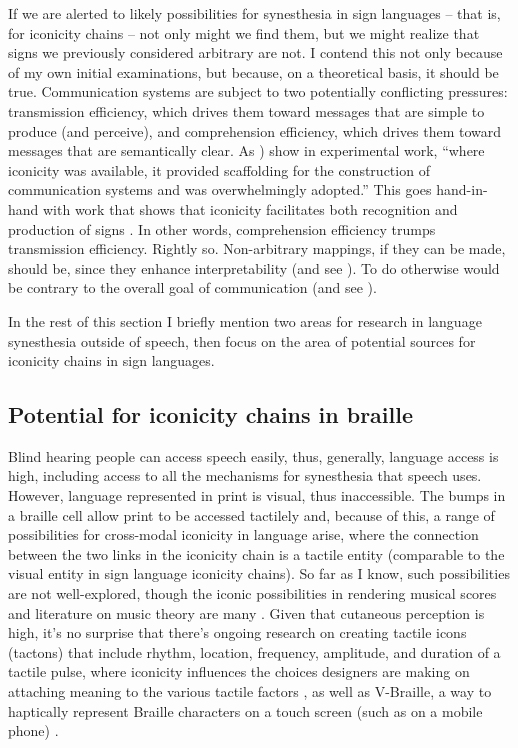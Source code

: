 \documentclass[output=paper,
modfonts
]{LSP/langsci}
\begin{document}
If we are alerted to likely possibilities for synesthesia in sign
languages -- that is, for iconicity chains -- not only might we find
them, but we might realize that signs we previously considered arbitrary
are not. I contend this not only because of my own initial examinations,
but because, on a theoretical basis, it should be true. Communication
systems are subject to two potentially conflicting pressures:
transmission efficiency, which drives them toward messages that are
simple to produce (and perceive), and comprehension efficiency, which
drives them toward messages that are semantically clear. As \citet[52]{roberts2015}) show in experimental work, ``where
iconicity was available, it provided scaffolding for the construction of
communication systems and was overwhelmingly adopted.'' This goes
hand-in-hand with work that shows that iconicity facilitates both
recognition and production of signs \citep{vinson2015}. In other
words, comprehension efficiency trumps transmission efficiency. Rightly
so. Non-arbitrary mappings, if they can be made, should be, since they
enhance interpretability (and see \citealt{givon1989}). To do otherwise would be
contrary to the overall goal of communication (and see \citealt{napoli-forthcoming}).

In the rest of this section I briefly mention two areas for research in
language synesthesia outside of speech, then focus on the area of
potential sources for iconicity chains in sign languages.

\subsection{Potential for iconicity chains in braille}

Blind hearing people can access speech easily, thus, generally, language
access is high, including access to all the mechanisms for synesthesia
that speech uses. However, language represented in print is visual, thus
inaccessible. The bumps in a braille cell allow print to be accessed
tactilely and, because of this, a range of possibilities for cross-modal
iconicity in language arise, where the connection between the two links
in the iconicity chain is a tactile entity (comparable to the visual
entity in sign language iconicity chains). So far as I know, such
possibilities are not well-explored, though the iconic possibilities in
rendering musical scores and literature on music theory are many \citep{pacun2009,johnson2009n}. Given that cutaneous perception is high, it's no
surprise that there's ongoing research on creating tactile icons
(tactons) that include rhythm, location, frequency, amplitude, and
duration of a tactile pulse, where iconicity influences the choices
designers are making on attaching meaning to the various tactile factors
\citep{brewster2004}, as well as V-Braille, a way to haptically
represent Braille characters on a touch screen (such as on a mobile
phone) \citep{jayant2010}.
\end{document}
